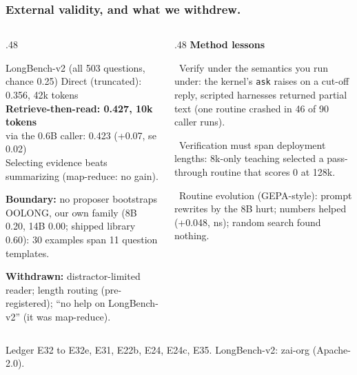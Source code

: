 \documentclass[aspectratio=169,11pt]{beamer}
\newcommand{\source}[1]{\vfill{\scriptsize\color{Gray}#1\par}}
\begin{document}
\begin{frame}[t]
\frametitle{External validity, and what we withdrew.}
\begin{columns}[T,onlytextwidth]
\begin{column}{.48\textwidth}
\begin{block}{LongBench-v2 (all 503 questions, chance 0.25)}
\footnotesize
Direct (truncated): 0.356, 42k tokens\\
\textbf{Retrieve-then-read: 0.427, 10k tokens}\\
via the 0.6B caller: 0.423 (+0.07, se 0.02)\\[1mm]
Selecting evidence beats summarizing (map-reduce: no gain).
\end{block}
\footnotesize \textbf{Boundary:} no proposer bootstraps OOLONG, our own family (8B 0.20, 14B 0.00; shipped
library 0.60): 30 examples span 11 question templates.\par\smallskip
\textbf{Withdrawn:} distractor-limited reader; length routing (pre-registered); ``no help on
LongBench-v2'' (it was map-reduce).
\end{column}
\begin{column}{.48\textwidth}
\footnotesize
\textbf{Method lessons}\par\smallskip
\textbullet\ Verify under the semantics you run under: the kernel's \texttt{ask} raises on a cut-off reply,
scripted harnesses returned partial text (one routine crashed in 46 of 90 caller runs).\par\smallskip
\textbullet\ Verification must span deployment lengths: 8k-only teaching selected a pass-through routine that
scores 0 at 128k.\par\smallskip
\textbullet\ Routine evolution (GEPA-style): prompt rewrites by the 8B hurt; numbers helped (+0.048, ns);
random search found nothing.
\end{column}
\end{columns}
\source{Ledger E32 to E32e, E31, E22b, E24, E24c, E35. LongBench-v2: zai-org (Apache-2.0).}
\end{frame}
\end{document}
